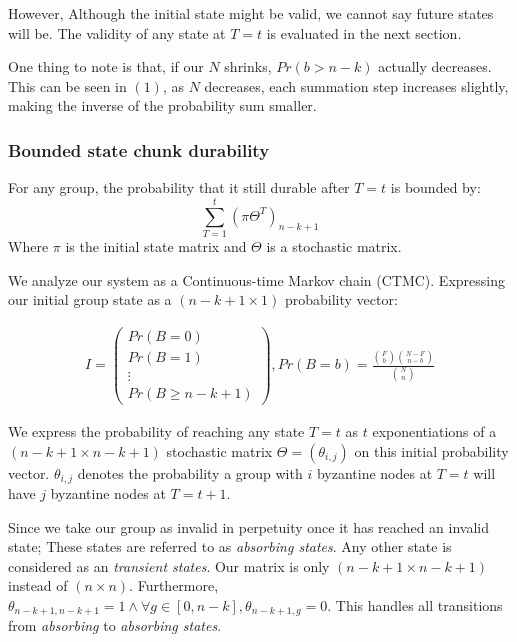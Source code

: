 However, Although the initial state might be valid, we cannot say future states will be. The validity of any state at $T=t$ is evaluated in the next section. 

One thing to note is that, if our $N$ shrinks, $Pr(b>n-k)$ actually decreases. This can be seen in $(1)$, as $N$ decreases, each summation step increases slightly, making the inverse of the probability sum smaller. 

\subsubsection{Bounded state chunk durability}

\begin{lemma}
    \label{lemma 1}
    For any group, the probability that it still durable after $T=t$ is bounded by:
    \[
        \sum_{T=1}^{t} (\pi \Theta^{T})_{n-k+1}
    \]
    Where $\pi$ is the initial state matrix and $\Theta$ is a stochastic matrix. 
\end{lemma}



We analyze our system as a Continuous-time Markov chain (CTMC). Expressing our initial group state as a $(n-k+1 \times 1)$ probability vector:

\begin{gather}
    I = \begin{pmatrix}
            Pr(B=0) \\ 
            Pr(B=1)\\
            \vdots \\
            Pr(B \geq n-k+1)
            \end{pmatrix}, 
    Pr(B = b) = \frac{\binom{F}{b}\binom{N-F}{n-b}}{\binom{N}{n}}
\end{gather}

We express the probability of reaching any state $T=t$ as $t$ exponentiations of a $(n-k+1 \times n-k+1)$ stochastic matrix $\Theta = (\theta_{i,j})$ on this initial probability vector.
$\theta_{i,j}$ denotes the probability a group with $i$ byzantine nodes at $T=t$ will have $j$ byzantine nodes at $T=t+1$. 

Since we take our group as invalid in perpetuity once it has reached an invalid state; These states are referred to as \textit{absorbing states}. Any other state is considered as an \textit{transient states}. Our matrix is only $(n-k+1 \times n-k+1)$ instead of $(n \times n)$. Furthermore, $\theta_{n-k+1,n-k+1} = 1 \wedge \forall g\in[0,n-k], \theta_{n-k+1,g} = 0$. This handles all transitions from \textit{absorbing} to \textit{absorbing states}. 

